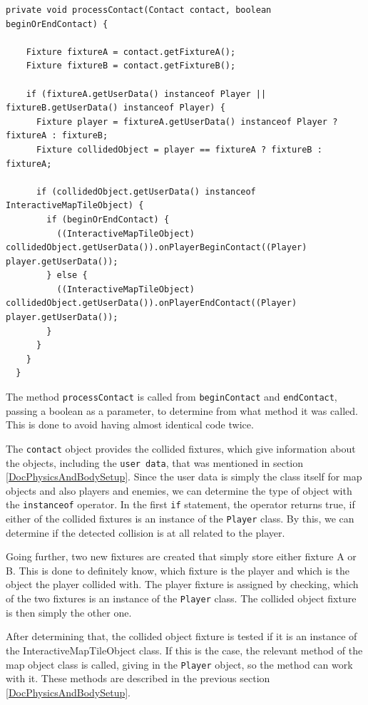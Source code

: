 \documentclass[12p]{article}
\begin{document}
\begin{verbatim}
private void processContact(Contact contact, boolean beginOrEndContact) {

    Fixture fixtureA = contact.getFixtureA();
    Fixture fixtureB = contact.getFixtureB();

    if (fixtureA.getUserData() instanceof Player || fixtureB.getUserData() instanceof Player) {
      Fixture player = fixtureA.getUserData() instanceof Player ? fixtureA : fixtureB;
      Fixture collidedObject = player == fixtureA ? fixtureB : fixtureA;

      if (collidedObject.getUserData() instanceof InteractiveMapTileObject) {
        if (beginOrEndContact) {
          ((InteractiveMapTileObject) collidedObject.getUserData()).onPlayerBeginContact((Player) player.getUserData());
        } else {
          ((InteractiveMapTileObject) collidedObject.getUserData()).onPlayerEndContact((Player) player.getUserData());
        }
      }
    }
  }
\end{verbatim}

The method \texttt{processContact} is called from \texttt{beginContact} and \texttt{endContact}, passing a boolean as a parameter, to determine from what method it was called. This is done to avoid having almost identical code twice.

The \texttt{contact} object provides the collided fixtures, which give information about the objects, including the \texttt{user data}, that was mentioned in section \ref{DocPhysicsAndBodySetup}. Since the user data is simply the class itself for map objects and also players and enemies, we can determine the type of object with the \texttt{instanceof} operator. In the first \texttt{if} statement, the operator returns true, if either of the collided fixtures is an instance of the \texttt{Player} class. By this, we can determine if the detected collision is at all related to the player.

Going further, two new fixtures are created that simply store either fixture A or B. This is done to definitely know, which fixture is the player and which is the object the player collided with. The player fixture is assigned by checking, which of the two fixtures is an instance of the \texttt{Player} class. The collided object fixture is then simply the other one.

After determining that, the collided object fixture is tested if it is an instance of the InteractiveMapTileObject class. If this is the case, the relevant method of the map object class is called, giving in the \texttt{Player} object, so the method can work with it. These methods are described in the previous section \ref{DocPhysicsAndBodySetup}.
\end{document}
